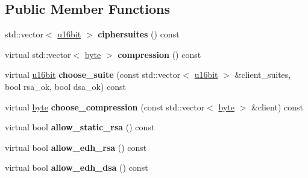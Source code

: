 \subsection*{Public Member Functions}
\begin{DoxyCompactItemize}
\item 
\hypertarget{classBotan_1_1TLS__Policy_a8246889c9279024ed3ddf866ad4709ac}{std\-::vector$<$ \hyperlink{namespaceBotan_ab07face63a00c39ea6ed97f203ee501c}{u16bit} $>$ {\bfseries ciphersuites} () const }\label{classBotan_1_1TLS__Policy_a8246889c9279024ed3ddf866ad4709ac}

\item 
\hypertarget{classBotan_1_1TLS__Policy_ac7154bd11ae31cfaf2b1293412641270}{virtual std\-::vector$<$ \hyperlink{namespaceBotan_a7d793989d801281df48c6b19616b8b84}{byte} $>$ {\bfseries compression} () const }\label{classBotan_1_1TLS__Policy_ac7154bd11ae31cfaf2b1293412641270}

\item 
\hypertarget{classBotan_1_1TLS__Policy_a3c245497f05ce6024f07e8056e9b7623}{virtual \hyperlink{namespaceBotan_ab07face63a00c39ea6ed97f203ee501c}{u16bit} {\bfseries choose\-\_\-suite} (const std\-::vector$<$ \hyperlink{namespaceBotan_ab07face63a00c39ea6ed97f203ee501c}{u16bit} $>$ \&client\-\_\-suites, bool rsa\-\_\-ok, bool dsa\-\_\-ok) const }\label{classBotan_1_1TLS__Policy_a3c245497f05ce6024f07e8056e9b7623}

\item 
\hypertarget{classBotan_1_1TLS__Policy_a99533437f70bf26bb28be28678091d11}{virtual \hyperlink{namespaceBotan_a7d793989d801281df48c6b19616b8b84}{byte} {\bfseries choose\-\_\-compression} (const std\-::vector$<$ \hyperlink{namespaceBotan_a7d793989d801281df48c6b19616b8b84}{byte} $>$ \&client) const }\label{classBotan_1_1TLS__Policy_a99533437f70bf26bb28be28678091d11}

\item 
\hypertarget{classBotan_1_1TLS__Policy_adb087a5bb872b91cb646f56acf88d101}{virtual bool {\bfseries allow\-\_\-static\-\_\-rsa} () const }\label{classBotan_1_1TLS__Policy_adb087a5bb872b91cb646f56acf88d101}

\item 
\hypertarget{classBotan_1_1TLS__Policy_a0af6faa6f6c39d43788421a37ffee4e0}{virtual bool {\bfseries allow\-\_\-edh\-\_\-rsa} () const }\label{classBotan_1_1TLS__Policy_a0af6faa6f6c39d43788421a37ffee4e0}

\item 
\hypertarget{classBotan_1_1TLS__Policy_accdca5b3a4fdc550830a16f0f8358f57}{virtual bool {\bfseries allow\-\_\-edh\-\_\-dsa} () const }\label{classBotan_1_1TLS__Policy_accdca5b3a4fdc550830a16f0f8358f57}


\end{DoxyCompactItemize}
